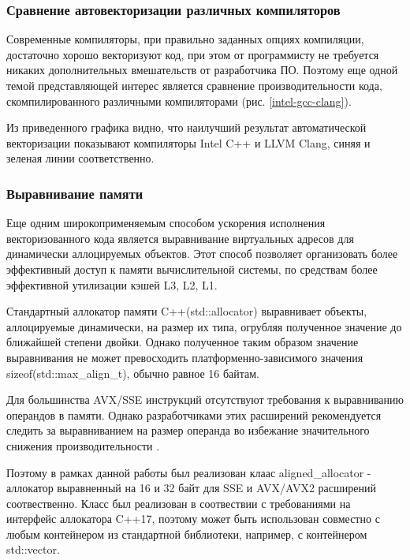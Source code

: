 
\subsubsection{Сравнение автовекторизации различных компиляторов}

Современные компиляторы, при правильно заданных опциях компиляции, достаточно хорошо векторизуют код,
при этом от программисту не требуется никаких дополнительных вмешательств от разработчика ПО.
Поэтому еще одной темой представляющей интерес является сравнение производительности кода,
скомпилированного различными компиляторами (рис. \ref{intel-gcc-clang}).


Из приведенного графика видно, что наилучший результат автоматической векторизации показывают
компиляторы Intel C++ и LLVM Clang, синяя и зеленая линии соответственно.

\subsubsection{Выравнивание памяти}

Еще одним широкоприменяемым способом ускорения исполнения векторизованного кода является выравнивание виртуальных адресов
для динамически аллоцируемых объектов. Этот способ позволяет организовать более эффективный доступ к памяти вычислительной системы,
по средствам более эффективной утилизации кэшей L3, L2, L1.

Стандартный аллокатор памяти C++(std::allocator) выравнивает объекты, аллоцируемые динамически, на размер их типа,
огрубляя полученное значение до ближайшей степени двойки.
Однако полученное таким образом значение выравнивания не может превосходить платформенно-зависимого значения sizeof(std::max\_align\_t),
обычно равное 16 байтам.

Для большинства AVX/SSE инструкций отсутствуют требования к выравниванию операндов в памяти. 
Однако разработчиками этих расширений рекомендуется следить за выравниванием на размер операнда
во избежание значительного снижения производительности \cite{intel}.

Поэтому в рамках данной работы был реализован клаас aligned\_allocator - аллокатор выравненный
на 16 и 32 байт для SSE и AVX/AVX2 расширений соотвественно.
Класс был реализован в соотвествии с требованиями на интерфейс аллокатора C++17, поэтому может быть использован совместно с любым
контейнером из стандартной библиотеки, например, с контейнером std::vector.

\clearpage
